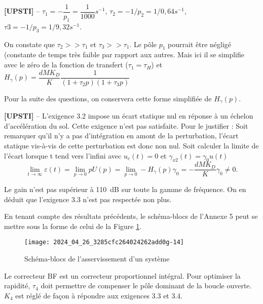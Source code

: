 \ifprof
\begin{corrige}%
\textbf{[UPSTI]} -- 
$\tau_1=-\dfrac{1}{p_1} =\dfrac{1}{1000}\si{s^{-1}}$,  $\tau_2=-1/p_2 =1/0,64 \si{s^{-1}}$,  $\tau3=-1/p_3 =1/9,32\si{s^{-1}}$. 

On constate que $\tau_2 >> \tau_1$ et $\tau_3>> \tau_1$. Le pôle $p_1$ pourrait être négligé (constante de temps très faible par rapport aux autres. Mais ici il se simplifie avec le zéro de la fonction de transfert ($\tau_1=\tau_H$) et 
$H_{\gamma} (p)= \dfrac{dMK_D}{K} \dfrac{ 1}{(1+\tau_2 p)(1+\tau_3 p)}$

\end{corrige}
\else
\fi


Pour la suite des questions, on conservera cette forme simplifiée de $H_{\gamma}(p)$.

\ifprof
\begin{corrige}%
\textbf{[UPSTI]} -- 
L’exigence 3.2 impose un écart statique nul en réponse à un échelon d’accélération du sol. Cette exigence n’est pas satisfaite. Pour le justifier :
	Soit remarquer qu’il n’y a pas d’intégration en amont de la perturbation, l’écart statique vis-à-vis de cette perturbation est donc non nul.
	Soit calculer la limite de l’écart lorsque t tend vers l’infini avec $u_c (t)=0$ et $\gamma_{x2} (t)= \gamma_0 u(t)$ 
	$$ \lim_{t\to\infty}  \varepsilon(t) 
	= \lim_{p\to 0}  pU(p) 
	= \lim_{p\to 0}-H_{\gamma} (p) \gamma_0 =-\dfrac{dMK_D}{K} \gamma_0 \neq 0.$$

Le gain n’est pas supérieur à \SI{110}{dB} sur toute la gamme de fréquence. On en déduit que l’exigence 3.3 n’est pas respectée non plus.

\end{corrige}
\else
\fi

\ifprof
\else
En tenant compte des résultats précédents, le schéma-blocs de l'Annexe 5 peut se mettre sous la forme de celui de la Figure \ref{ccmp2023_fig_13}.

\begin{figure}[!h]
\centering
\texttt{[image: 2024\_04\_26\_3285cfc264024262add0g-14]}
\caption{\label{ccmp2023_fig_13}  Schéma-blocs de l'asservissement d'un système}
\end{figure}



Le correcteur BF est un correcteur proportionnel intégral. Pour optimiser la rapidité, $\tau_{4}$ doit permettre de compenser le pôle dominant de la boucle ouverte. $K_{4}$ est réglé de façon à répondre aux exigences 3.3 et 3.4.
\fi

